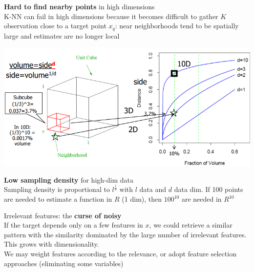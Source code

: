 \documentclass[10pt]{report}
\begin{document}
\begin{list}{}{}
	\item \textbf{Hard to find nearby points} in high dimensions\\
	K-NN can fail in high dimensions because it becomes difficult to gather $K$ observation close to a target point $x_q$: near neighborhoods tend to be spatially large and estimates are no longer local
	\begin{center}
		\includegraphics[scale=0.75]{5.png}
	\end{center}
	\item \textbf{Low sampling density} for high-dim data\\
	Sampling density is proportional to $l^{\frac{l}{d}}$ with $l$ data and $d$ data dim. If 100 points are needed to estimate a function in $R$ (1 dim), then $100^{10}$ are needed in $R^{10}$
	\item Irrelevant features: the \textbf{curse of noisy}\\
	If the target depends only on a few features in $x$, we could retrieve a similar pattern with the similarity dominated by the large number of irrelevant features.\\
	This grows with dimensionality.\\
	We may weight features according to the relevance, or adopt feature selection approaches (eliminating some variables)
\end{list}
\end{document}
